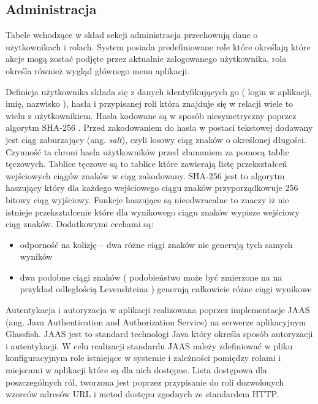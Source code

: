  
  
\subsection{Administracja}  


Tabele wchodzące w skład sekcji administracja przechowują dane o użytkownikach i rolach. System posiada predefiniowane role które określają które akcje mogą zostać podjęte przez aktualnie zalogowanego użytkownika, rola określa również wygląd głównego menu aplikacji.

Definicja użytkownika składa się z danych identyfikujących go ( login w aplikacji, imię, nazwisko ), hasła i przypisanej roli która znajduje się w relacji wiele to wielu z użytkownikiem. Hasła kodowane są w sposób niesymetryczny poprzez algorytm SHA-256 \cite{sha2}. Przed zakodowaniem do hasła w postaci tekstowej dodawany jest ciąg zaburzający (ang. \textit{salt}), czyli losowy ciąg znaków o określonej długości. Czynność ta chroni hasła użytkowników przed złamaniem za pomocą tablic tęczowych. Tablice tęczowe są to tablice które zawierają listę przekształceń wejściowych ciągów znaków w ciąg zakodowany. SHA-256 jest to algorytm haszujący \cite{hash} który dla każdego wejściowego ciągu znaków przyporządkowuje 256 bitowy ciąg wyjściowy. Funkcje haszujące są nieodwracalne to znaczy iż nie istnieje przekształcenie które dla wynikowego ciągu znaków wypisze wejściowy ciąg znaków. Dodatkowymi cechami są:
\begin{itemize}
  \item  odporność na kolizję --  dwa różne ciągi znaków nie generują tych samych wyników 
  \item dwa podobne ciągi znaków ( podobieństwo może być zmierzone na na przykład odległością Levenshteina\cite{Levenshtein} ) generują całkowicie różne ciągi wynikowe
\end{itemize}

Autentykacja i autoryzacja w aplikacji realizowana poprzez implementacje JAAS\cite{jaas} (ang. Java Authentication and Authorization Service) na serwerze aplikacyjnym Glassfish. JAAS jest to standard technologi Java który określa sposób autoryzacji i autentykacji. W celu realizacji standardu JAAS należy zdefiniować w pliku konfiguracyjnym role istniejące w systemie i zależności pomiędzy rolami i miejscami w aplikacji które są dla nich dostępne. Lista dostępowa dla poszczególnych ról, tworzona jest poprzez przypisanie do roli dozwolonych wzorców adresów URL i metod dostępu zgodnych ze standardem HTTP.

